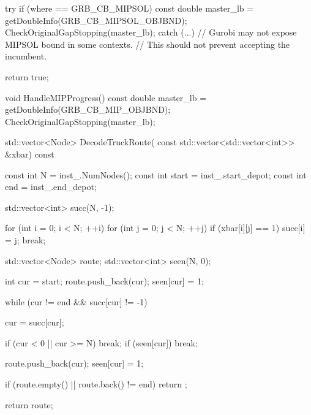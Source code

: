 {{{{                try
                {
                    if (where == GRB_CB_MIPSOL)
                    {
                        const double master_lb = getDoubleInfo(GRB_CB_MIPSOL_OBJBND);
                        CheckOriginalGapStopping(master_lb);
                    }
                }
                catch (...)
                {
                    // Gurobi may not expose MIPSOL bound in some contexts.
                    // This should not prevent accepting the incumbent.
                }

                return true;
            }

            void HandleMIPProgress()
            {
                const double master_lb = getDoubleInfo(GRB_CB_MIP_OBJBND);
                CheckOriginalGapStopping(master_lb);
            }

            std::vector<Node> DecodeTruckRoute(
                const std::vector<std::vector<int>> &xbar) const
            {
                const int N = inst_.NumNodes();
                const int start = inst_.start_depot;
                const int end = inst_.end_depot;

                std::vector<int> succ(N, -1);

                for (int i = 0; i < N; ++i)
                {
                    for (int j = 0; j < N; ++j)
                    {
                        if (xbar[i][j] == 1)
                        {
                            succ[i] = j;
                            break;
                        }
                    }
                }

                std::vector<Node> route;
                std::vector<int> seen(N, 0);

                int cur = start;
                route.push_back(cur);
                seen[cur] = 1;

                while (cur != end && succ[cur] != -1)
                {
                    cur = succ[cur];

                    if (cur < 0 || cur >= N)
                        break;
                    if (seen[cur])
                        break;

                    route.push_back(cur);
                    seen[cur] = 1;
                }

                if (route.empty() || route.back() != end)
                {
                    return {};
                }

                return route;
            }

}}}
